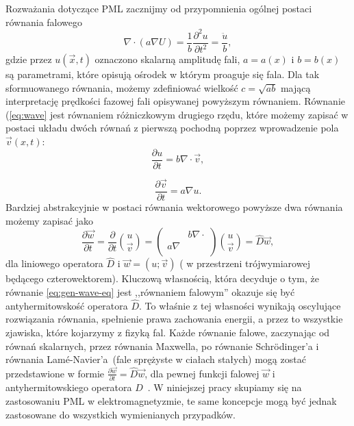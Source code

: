Rozważania dotyczące PML zacznijmy od przypomnienia ogólnej postaci równania falowego~\cite{barton1989elements}
\begin{equation}
\nabla \cdot ( a \nabla U) = \frac{1}{b} \frac{\partial^2 u}{\partial t^2} = \frac{\ddot{u}}{b},
\label{eq:wave}
\end{equation}
gdzie przez $u(\vec{x},t)$ oznaczono skalarną amplitudę fali, $a=a(x)$ i $b=b(x)$ są parametrami, które opisują ośrodek w którym proaguje się fala. Dla tak sformuowanego równania, możemy zdefiniować wielkość $c=\sqrt{ab}$ mającą interpretację prędkości fazowej fali opisywanej powyższym równaniem. Równanie (\ref{eq:wave} jest równaniem różniczkowym drugiego rzędu, które możemy zapisać w postaci układu dwóch równań z pierwszą pochodną poprzez wprowadzenie pola $\vec{v}(x,t)$:
\begin{equation}
\frac{\partial u}{\partial t} = b \nabla \cdot \vec{v},
\end{equation}

\begin{equation}
\frac{\partial \vec{v}}{\partial t}= a\nabla u.
\end{equation}
Bardziej abstrakcyjnie w postaci równania wektorowego powyższe dwa równania możemy zapisać jako
\begin{equation}
\frac{\partial \vec{w}}{\partial t}=\frac{\partial}{\partial t} {u \choose \vec{v}} = 
	\begin{pmatrix}
		& b\nabla\cdot \\
	a\nabla & \\
	\end{pmatrix}
{u \choose \vec{v}} = \hat{D}\vec{w},
\label{eq:gen-wave-eq}
\end{equation}
dla liniowego operatora $\hat{D}$ i $\vec{w}=(u;\vec{v})$ ( w przestrzeni trójwymiarowej będącego czterowektorem). Kluczową własnością, która decyduje o tym, że równanie \ref{eq:gen-wave-eq} jest ,,równaniem falowym''  okazuje się być antyhermitowskość operatora $\hat{D}$. To właśnie z tej własności wynikają oscylujące rozwiązania równania, spełnienie prawa zachowania energii, a przez to wszystkie zjawiska, które kojarzymy z fizyką fal. Każde równanie falowe, zaczynając od równań skalarnych, przez równania Maxwella,  po równanie Schr\"{o}dinger'a i równania Lam\'{e}-Navier'a~(fale sprężyste w ciałach stałych) mogą zostać przedstawione w formie $ \frac{\partial  \vec{w}}{\partial t}=\hat{D}\vec{w}$, dla pewnej funkcji falowej $\vec{w}$ i antyhermitowskiego operatora $\hat{D}$~\cite{johnson2007notes}. W niniejszej pracy skupiamy się na zastosowaniu PML w elektromagnetyzmie, te same koncepcje mogą być jednak zastosowane do wszystkich wymienianych przypadków.


